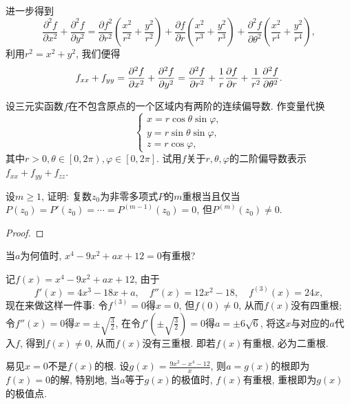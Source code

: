 \begin{quiza}
\begin{solution}
\[\begin{split}
\end{split}\]进一步得到\[\frac{\partial^2f}{\partial x^2}+\frac{\partial^2f}{\partial y^2}=\frac{\partial f^2}{\partial r^2}\left(\frac{x^2}{r^2}+\frac{y^2}{r^2}\right)+\frac{\partial f}{\partial r}\left(\frac{x^2}{r^3}+\frac{y^2}{r^3}\right)+\frac{\partial^2 f}{\partial\theta^2}\left(\frac{x^2}{r^4}+\frac{y^2}{r^4}\right),\]
利用\(r^2=x^2+y^2\), 我们便得\[f_{xx}+f_{yy}=\frac{\partial^2f}{\partial x^2}+\frac{\partial^2f}{\partial y^2}=\frac{\partial^2f}{\partial r^2}+\frac{1}{r}\frac{\partial f}{\partial r}+\frac{1}{r^2}\frac{\partial^2f}{\partial\theta^2}.\qedhere\]
\end{solution}
\woe 设三元实函数\(f\)在不包含原点的一个区域内有两阶的连续偏导数. 作变量代换\[\begin{cases}
    x=r\cos\theta\sin\varphi,\\
    y=r\sin\theta\sin\varphi,\\
    z=r\cos\varphi,
\end{cases}\]其中\(r>0,\theta\in\left[0,2\pi\right),\varphi\in[0,2\pi]\). 试用\(f\)关于\(r,\theta,\varphi\)的二阶偏导数表示\(f_{xx}+f_{yy}+f_{zz}\).
\begin{solution}

\end{solution}
\woe 设\(m\geqslant1\), 证明: 复数\(z_0\)为非零多项式\(P\)的\(m\)重根当且仅当\(P(z_0)=P'(z_0)=\cdots=P^{(m-1)}(z_0)=0\), 但\(P^{(m)}(z_0)\ne 0\).
\begin{proof}

\end{proof}
\woe 当\(a\)为何值时, \(x^4-9x^2+ax+12=0\)有重根?
\begin{solution}
记\(f(x)=x^4-9x^2+ax+12\), 由于\[f'(x)=4x^3-18x+a,\quad f''(x)=12x^2-18,\quad f^{(3)}(x)=24x,\]现在来做这样一件事: 令\(f^{(3)}=0\)得\(x=0\), 但\(f(0)\ne 0\), 从而\(f(x)\)没有四重根; 令\(f''(x)=0\)得\(x=\pm\sqrt{\frac{3}{2}}\), 在令\(f'\left(\pm\sqrt{\frac{3}{2}}\right)=0\)得\(a=\pm 6\sqrt{6}\), 将这\(x\)与对应的\(a\)代入\(f\), 得到\(f(x)\ne 0\), 从而\(f(x)\)没有三重根. 即若\(f(x)\)有重根, 必为二重根.

易见\(x=0\)不是\(f(x)\)的根. 设\(g(x)=\frac{9x^2-x^4-12}{x}\), 则\(a=g(x)\)的根即为\(f(x)=0\)的解, 特别地, 当\(a\)等于\(g(x)\)的极值时, \(f(x)\)有重根, 重根即为\(g(x)\)的极值点.


\end{solution}
\end{quiza}
